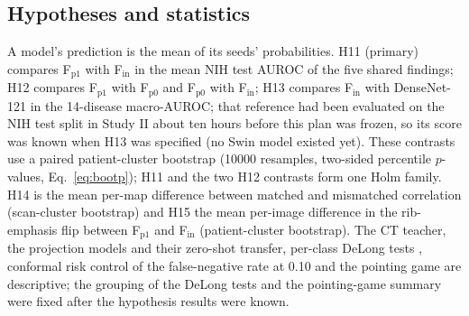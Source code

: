 \subsection{Hypotheses and statistics}
\label{sec:xm_stats}
A model's prediction is the mean of its seeds' probabilities. H11 (primary) compares F$_\mathrm{p1}$ with F$_\mathrm{in}$ in the mean NIH
test AUROC of the five shared findings; H12 compares F$_\mathrm{p1}$ with F$_\mathrm{p0}$ and F$_\mathrm{p0}$ with F$_\mathrm{in}$; H13
compares F$_\mathrm{in}$ with DenseNet-121 in the 14-disease macro-AUROC; that reference had been evaluated on the NIH test split in Study II
about ten hours before this plan was frozen, so its score was known when H13 was specified (no Swin model existed yet). These contrasts use a paired patient-cluster bootstrap
(\num{10000} resamples, two-sided percentile $p$-values, Eq.~\eqref{eq:bootp}); H11 and the two H12 contrasts form one Holm family. H14 is
the mean per-map difference between matched and mismatched correlation (scan-cluster bootstrap) and H15 the mean per-image difference in the
rib-emphasis flip between F$_\mathrm{p1}$ and F$_\mathrm{in}$ (patient-cluster bootstrap). The CT teacher, the projection models and their
zero-shot transfer, per-class DeLong tests \citep{delong1988auc}, conformal risk control of the false-negative rate at 0.10
\citep{angelopoulos2022crc} and the pointing game are descriptive; the grouping of the DeLong tests and the pointing-game summary were fixed
after the hypothesis results were known.

